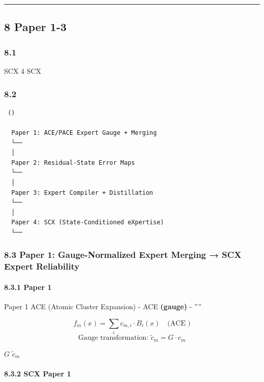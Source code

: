\documentclass[
  12pt,
]{article}
\begin{document}
\begin{center}\rule{0.5\linewidth}{0.5pt}\end{center}

\subsection{ 8 Paper 1-3
}\label{ux6a21ux5757-8ux4e0e-paper-1-3-ux7684ux8fdeux63a5}

\subsubsection{8.1 }\label{ux95eeux9898ux8bbeux5b9a-7}

SCX
4
SCX 

\subsubsection{8.2
}\label{ux56dbux7bc7ux8bbaux6587ux7684ux5c42ux7ea7ux5173ux7cfb}

\begin{verbatim}
 ()

  Paper 1: ACE/PACE Expert Gauge + Merging
  └── 
  │
  Paper 2: Residual-State Error Maps
  └── 
  │
  Paper 3: Expert Compiler + Distillation
  └── 
  │
  Paper 4: SCX (State-Conditioned eXpertise)
  └── 
\end{verbatim}

\subsubsection{8.3 Paper 1: Gauge-Normalized Expert Merging → SCX 
Expert Reliability
}\label{paper-1-gauge-normalized-expert-merging-scx-ux7684-expert-reliability-ux57faux7840}

\paragraph{8.3.1 Paper 1
}\label{paper-1-ux7684ux6838ux5fc3ux5185ux5bb9}

Paper 1  ACE (Atomic Cluster Expansion)
 -  ACE \textbf{
(gauge)} -
''''

\textbf{} \[
f_m(x) = \sum_{i} c_{m,i} \cdot B_i(x) \quad \text{(ACE )}
\] \[
\text{Gauge transformation: } \tilde{c}_m = G \cdot c_m
\]

 \(G\)  \(\tilde{c}_m\) 

\paragraph{8.3.2 SCX  Paper 1
}\label{scx-ux4ece-paper-1-ux7ee7ux627fux7684ux6d1eux5bdf}
\end{document}
